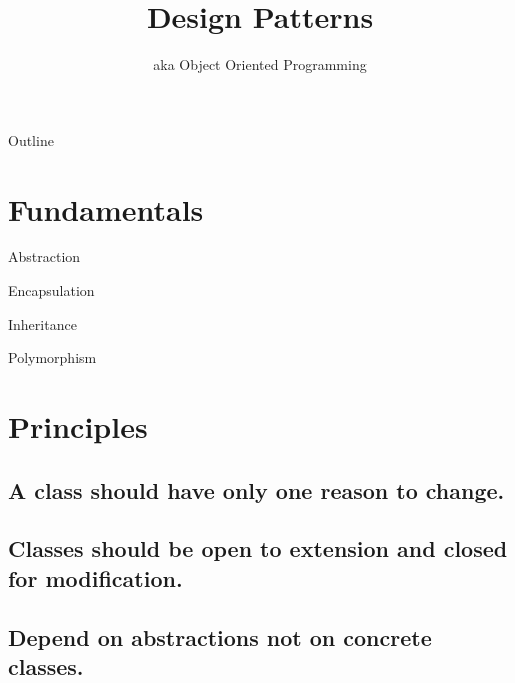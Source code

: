 \documentclass{beamer}
\title{Design Patterns}
\subtitle{aka Object Oriented Programming}
\begin{document}
\begin{frame}
  \titlepage
\end{frame}

\begin{frame}{Outline}
  \tableofcontents
\end{frame}

\section{Fundamentals}

\begin{frame}{Abstraction}
\end{frame}

\begin{frame}{Encapsulation}
\end{frame}

\begin{frame}{Inheritance}
\end{frame}

\begin{frame}{Polymorphism}
\end{frame}

\section{Principles}

\subsection{A class should have only one reason to change.}

\begin{frame}{}
    
\end{frame}

\subsection{Classes should be open to extension and closed for modification.}

\begin{frame}{}
\end{frame}

\subsection{Depend on abstractions not on concrete classes.}

\begin{frame}{}
\end{frame}
\end{document}
